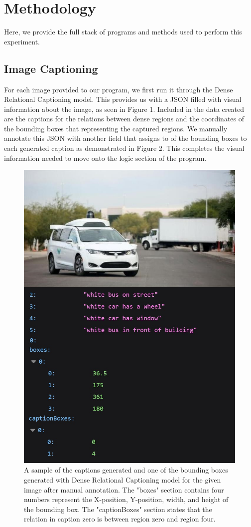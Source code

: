 \section{Methodology}
Here, we provide the full stack of programs and methods used to perform this experiment.

\subsection{Image Captioning}
For each image provided to our program, we first run it through the Dense Relational Captioning model. This provides us with a JSON filled with visual information about the image, as seen in Figure 1. Included in the data created are the captions for the relations between dense regions and the coordinates of the bounding boxes that representing the captured regions. We manually annotate this JSON with another field that assigns to of the bounding boxes to each generated caption as demonstrated in Figure 2. This completes the visual information needed to move onto the logic section of the program. 

\begin{figure}[htbp]
\centerline{\includegraphics[width=.5\textwidth]{img1.jpg}}
\caption{A sample of the captions generated and one of the bounding boxes generated with Dense Relational Captioning model for the given image after manual annotation. The "boxes" section contains four numbers represent the X-position, Y-position, width, and height of the bounding box. The "captionBoxes" section states that the relation in caption zero is between region zero and region four. \protect\footnotemark[1]}
\label{fig1}
\end{figure}

